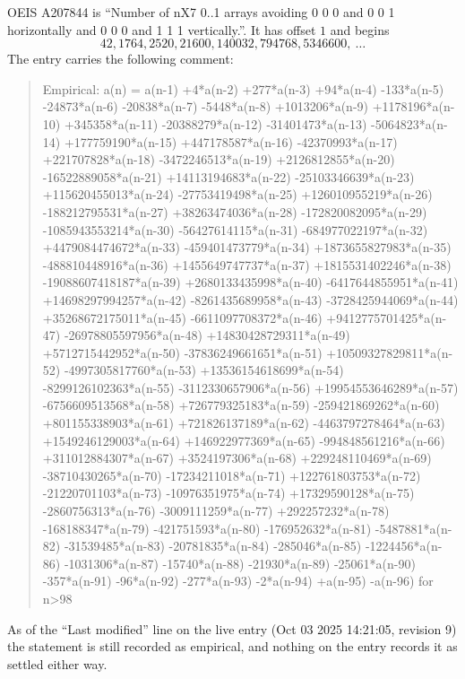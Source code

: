 \documentclass[11pt,a4paper]{article}
\theoremstyle{plain}
\theoremstyle{definition}
\begin{document}
OEIS A207844 is ``Number of nX7 0..1 arrays avoiding 0 0 0 and 0 0 1 horizontally and 0 0 0 and 1 1 1 vertically.''. It has offset
$1$ and begins
\[
42, 1764, 2520, 21600, 140032, 794768, 5346600,\ \dots
\]
The entry carries the following comment:
\begin{quote}\small
Empirical: a(n) = a(n-1) +4*a(n-2) +277*a(n-3) +94*a(n-4) -133*a(n-5) -24873*a(n-6) -20838*a(n-7) -5448*a(n-8) +1013206*a(n-9) +1178196*a(n-10) +345358*a(n-11) -20388279*a(n-12) -31401473*a(n-13) -5064823*a(n-14) +177759190*a(n-15) +447178587*a(n-16) -42370993*a(n-17) +221707828*a(n-18) -3472246513*a(n-19) +2126812855*a(n-20) -16522889058*a(n-21) +14113194683*a(n-22) -25103346639*a(n-23) +115620455013*a(n-24) -27753419498*a(n-25) +126010955219*a(n-26) -188212795531*a(n-27) +38263474036*a(n-28) -172820082095*a(n-29) -1085943553214*a(n-30) -56427614115*a(n-31) -684977022197*a(n-32) +4479084474672*a(n-33) -459401473779*a(n-34) +1873655827983*a(n-35) -488810448916*a(n-36) +1455649747737*a(n-37) +1815531402246*a(n-38) -19088607418187*a(n-39) +2680133435998*a(n-40) -6417644855951*a(n-41) +14698297994257*a(n-42) -8261435689958*a(n-43) -3728425944069*a(n-44) +35268672175011*a(n-45) -6611097708372*a(n-46) +9412775701425*a(n-47) -26978805597956*a(n-48) +14830428729311*a(n-49) +5712715442952*a(n-50) -37836249661651*a(n-51) +10509327829811*a(n-52) -4997305817760*a(n-53) +13536154618699*a(n-54) -8299126102363*a(n-55) -3112330657906*a(n-56) +19954553646289*a(n-57) -6756609513568*a(n-58) +726779325183*a(n-59) -259421869262*a(n-60) +801155338903*a(n-61) +721826137189*a(n-62) -4463797278464*a(n-63) +1549246129003*a(n-64) +146922977369*a(n-65) -994848561216*a(n-66) +311012884307*a(n-67) +3524197306*a(n-68) +229248110469*a(n-69) -38710430265*a(n-70) -17234211018*a(n-71) +122761803753*a(n-72) -21220701103*a(n-73) -10976351975*a(n-74) +17329590128*a(n-75) -2860756313*a(n-76) -3009111259*a(n-77) +292257232*a(n-78) -168188347*a(n-79) -421751593*a(n-80) -176952632*a(n-81) -5487881*a(n-82) -31539485*a(n-83) -20781835*a(n-84) -285046*a(n-85) -1224456*a(n-86) -1031306*a(n-87) -15740*a(n-88) -21930*a(n-89) -25061*a(n-90) -357*a(n-91) -96*a(n-92) -277*a(n-93) -2*a(n-94) +a(n-95) -a(n-96) for n>98
\end{quote}
As of the ``Last modified'' line on the live entry (Oct 03 2025 14:21:05, revision
9) the statement is still recorded as empirical, and nothing on the entry
records it as settled either way.
\end{document}
